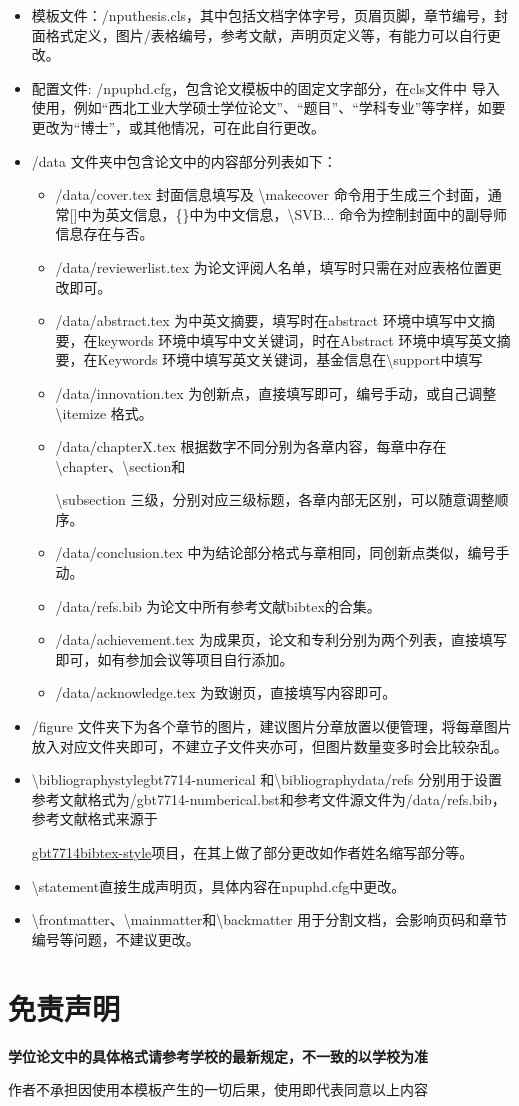 \begin{itemize}[leftmargin=*]
	\item 模板文件：/nputhesis.cls，其中包括文档字体字号，页眉页脚，章节编号，封面格式定义，图片/表格编号，参考文献，声明页定义等，有能力可以自行更改。
	\item 配置文件: /npuphd.cfg，包含论文模板中的固定文字部分，在cls文件中 导入使用，例如“西北工业大学硕士学位论文”、“题目”、“学科专业”等字样，如要更改为“博士”，或其他情况，可在此自行更改。
	\item /data 文件夹中包含论文中的内容部分列表如下：
	\begin{itemize}[leftmargin=*]
		\item /data/cover.tex 封面信息填写及 \textbackslash makecover 命令用于生成三个封面，通常[]中为英文信息，\{\}中为中文信息，\textbackslash SVB... 命令为控制封面中的副导师信息存在与否。
		\item /data/reviewerlist.tex 为论文评阅人名单，填写时只需在对应表格位置更改即可。
		\item /data/abstract.tex 为中英文摘要，填写时在abstract 环境中填写中文摘要，在keywords 环境中填写中文关键词，时在Abstract 环境中填写英文摘要，在Keywords 环境中填写英文关键词，基金信息在\textbackslash support中填写
		\item /data/innovation.tex 为创新点，直接填写即可，编号手动，或自己调整\textbackslash itemize 格式。
		\item /data/chapterX.tex 根据数字不同分别为各章内容，每章中存在 \textbackslash chapter、\textbackslash section和\par \textbackslash subsection 三级，分别对应三级标题，各章内部无区别，可以随意调整顺序。
		\item /data/conclusion.tex 中为结论部分格式与章相同，同创新点类似，编号手动。
		\item /data/refs.bib 为论文中所有参考文献bibtex的合集。
		\item /data/achievement.tex 为成果页，论文和专利分别为两个列表，直接填写即可，如有参加会议等项目自行添加。
		\item /data/acknowledge.tex 为致谢页，直接填写内容即可。
	\end{itemize}
	\item /figure 文件夹下为各个章节的图片，建议图片分章放置以便管理，将每章图片放入对应文件夹即可，不建立子文件夹亦可，但图片数量变多时会比较杂乱。
	\item \textbackslash bibliographystyle{gbt7714-numerical} 和\textbackslash bibliography{data/refs} 分别用于设置参考文献格式为/gbt7714-numberical.bst和参考文件源文件为/data/refs.bib，参考文献格式来源于\par\href{https://github.com/zepinglee/gbt7714-bibtex-style}{gbt7714bibtex-style}项目，在其上做了部分更改如作者姓名缩写部分等。
	\item \textbackslash statement直接生成声明页，具体内容在npuphd.cfg中更改。
	\item \textbackslash frontmatter、\textbackslash mainmatter和\textbackslash backmatter 用于分割文档，会影响页码和章节编号等问题，不建议更改。
\end{itemize}

\section{免责声明}
{
\bfseries
学位论文中的具体格式请参考学校的最新规定，不一致的以学校为准

作者不承担因使用本模板产生的一切后果，使用即代表同意以上内容}
